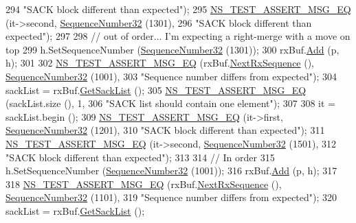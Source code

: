 \begin{DoxyCode}
294                          \textcolor{stringliteral}{"SACK block different than expected"});
295   \hyperlink{group__testing_ga2a9d78cffb3db8e867c35fff0b698cf5}{NS\_TEST\_ASSERT\_MSG\_EQ} (it->second, \hyperlink{classns3_1_1SequenceNumber}{SequenceNumber32} (1301),
296                          \textcolor{stringliteral}{"SACK block different than expected"});
297 
298   \textcolor{comment}{// out of order... I'm expecting a right-merge with a move on top}
299   h.SetSequenceNumber (\hyperlink{classns3_1_1SequenceNumber}{SequenceNumber32} (1301));
300   rxBuf.\hyperlink{classns3_1_1TcpRxBuffer_a35a036383b8976cb79738c28aa01d5d0}{Add} (p, h);
301 
302   \hyperlink{group__testing_ga2a9d78cffb3db8e867c35fff0b698cf5}{NS\_TEST\_ASSERT\_MSG\_EQ} (rxBuf.\hyperlink{classns3_1_1TcpRxBuffer_ae994bf90329d10f17b59d32907b04ca9}{NextRxSequence} (), 
      \hyperlink{group__network_gacb2070e4e98d2d5135c9bede58f07a03}{SequenceNumber32} (1001),
303                          \textcolor{stringliteral}{"Sequence number differs from expected"});
304   sackList = rxBuf.\hyperlink{classns3_1_1TcpRxBuffer_afc5d672da4595330754de1bb3933a9c7}{GetSackList} ();
305   \hyperlink{group__testing_ga2a9d78cffb3db8e867c35fff0b698cf5}{NS\_TEST\_ASSERT\_MSG\_EQ} (sackList.size (), 1,
306                          \textcolor{stringliteral}{"SACK list should contain one element"});
307 
308   it = sackList.begin ();
309   \hyperlink{group__testing_ga2a9d78cffb3db8e867c35fff0b698cf5}{NS\_TEST\_ASSERT\_MSG\_EQ} (it->first, \hyperlink{classns3_1_1SequenceNumber}{SequenceNumber32} (1201),
310                          \textcolor{stringliteral}{"SACK block different than expected"});
311   \hyperlink{group__testing_ga2a9d78cffb3db8e867c35fff0b698cf5}{NS\_TEST\_ASSERT\_MSG\_EQ} (it->second, \hyperlink{classns3_1_1SequenceNumber}{SequenceNumber32} (1501),
312                          \textcolor{stringliteral}{"SACK block different than expected"});
313 
314   \textcolor{comment}{// In order}
315   h.SetSequenceNumber (\hyperlink{classns3_1_1SequenceNumber}{SequenceNumber32} (1001));
316   rxBuf.\hyperlink{classns3_1_1TcpRxBuffer_a35a036383b8976cb79738c28aa01d5d0}{Add} (p, h);
317 
318   \hyperlink{group__testing_ga2a9d78cffb3db8e867c35fff0b698cf5}{NS\_TEST\_ASSERT\_MSG\_EQ} (rxBuf.\hyperlink{classns3_1_1TcpRxBuffer_ae994bf90329d10f17b59d32907b04ca9}{NextRxSequence} (), 
      \hyperlink{group__network_gacb2070e4e98d2d5135c9bede58f07a03}{SequenceNumber32} (1101),
319                          \textcolor{stringliteral}{"Sequence number differs from expected"});
320   sackList = rxBuf.\hyperlink{classns3_1_1TcpRxBuffer_afc5d672da4595330754de1bb3933a9c7}{GetSackList} ();

\end{DoxyCode}
